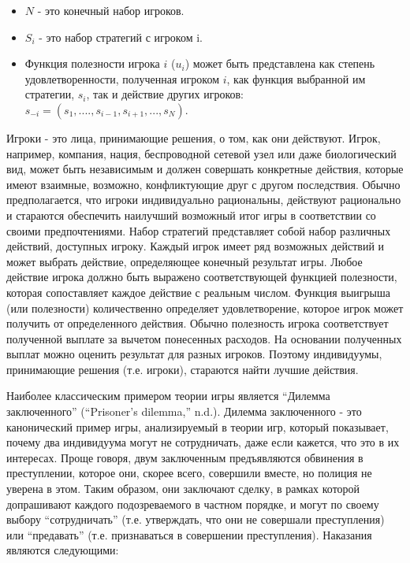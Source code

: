 \begin{itemize}
\item
  \(N\) - это конечный набор игроков.
\item
  \(S_i\) - это набор стратегий с игроком i.
\item
  Функция полезности игрока \(i\) (\(u_i\)) может быть представлена как
  степень удовлетворенности, полученная игроком \(i\), как функция
  выбранной им стратегии, \(s_i\), так и действие других игроков:
  \(s_{-i} = (s_1,....,s_{i-1}, s_{i+1},...,s_N)\).
\end{itemize}

Игроки - это лица, принимающие решения, о том, как они действуют. Игрок,
например, компания, нация, беспроводной сетевой узел или даже
биологический вид, может быть независимым и должен совершать конкретные
действия, которые имеют взаимные, возможно, конфликтующие друг с другом
последствия. Обычно предполагается, что игроки индивидуально
рациональны, действуют рационально и стараются обеспечить наилучший
возможный итог игры в соответствии со своими предпочтениями. Набор
стратегий представляет собой набор различных действий, доступных игроку.
Каждый игрок имеет ряд возможных действий и может выбрать действие,
определяющее конечный результат игры. Любое действие игрока должно быть
выражено соответствующей функцией полезности, которая сопоставляет
каждое действие с реальным числом. Функция выигрыша (или полезности)
количественно определяет удовлетворение, которое игрок может получить от
определенного действия. Обычно полезность игрока соответствует
полученной выплате за вычетом понесенных расходов. На основании
полученных выплат можно оценить результат для разных игроков. Поэтому
индивидуумы, принимающие решения (т.е. игроки), стараются найти лучшие
действия.

Наиболее классическим примером теории игры является ``Дилемма
заключенного'' (``Prisoner's dilemma,'' n.d.). Дилемма заключенного -
это канонический пример игры, анализируемый в теории игр, который
показывает, почему два индивидуума могут не сотрудничать, даже если
кажется, что это в их интересах. Проще говоря, двум заключенным
предъявляются обвинения в преступлении, которое они, скорее всего,
совершили вместе, но полиция не уверена в этом. Таким образом, они
заключают сделку, в рамках которой допрашивают каждого подозреваемого в
частном порядке, и могут по своему выбору ``сотрудничать'' (т.е.
утверждать, что они не совершали преступления) или ``предавать'' (т.е.
признаваться в совершении преступления). Наказания являются следующими:

